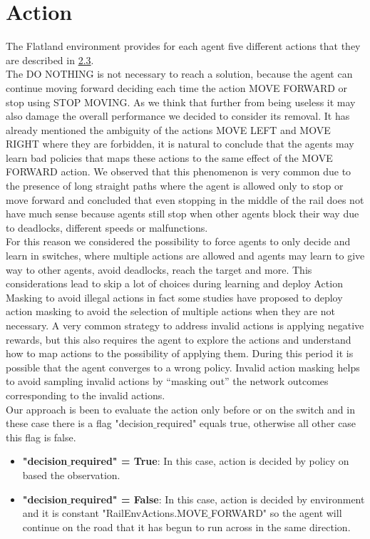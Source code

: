 \section{Action}
The Flatland environment provides for each agent five different actions that they are described in \hyperref[sec:envActions]{2.3}. \\ 
The DO NOTHING is not necessary to reach a solution, because the agent can continue moving forward deciding each time the action MOVE FORWARD or stop using STOP MOVING. As we think that further from being useless it may also damage the overall performance we decided to consider its removal. It has already mentioned the ambiguity of the actions MOVE LEFT and MOVE RIGHT where they are forbidden, it is natural to conclude that the agents may learn bad policies that maps these actions to the same effect of the MOVE FORWARD action. We observed that this phenomenon is very common due to the presence of long straight paths where the agent is allowed only to stop or move forward and concluded that even stopping in the middle of the rail does not have much sense because agents still stop when other agents block their way due to deadlocks, different speeds or malfunctions. \\
For this reason we considered the possibility to force agents to only decide and learn in switches, where multiple actions are allowed and agents may learn to give way to other agents, avoid deadlocks, reach the target and more. This considerations lead to skip a lot of choices during learning and deploy Action Masking to avoid illegal actions in fact some studies have proposed to deploy action masking to avoid the selection of multiple actions when they are not necessary. A very common strategy to address invalid actions is applying negative rewards, but this also requires the agent to explore the actions and understand how to map actions to the possibility of applying them. During this period it is possible that the agent converges to a wrong policy. Invalid action masking helps to avoid sampling invalid actions by “masking out” the network outcomes corresponding to the invalid actions. \\
Our approach is been to evaluate the action only before or on the switch and in these case there is a flag "decision$\_$required" equals true, otherwise all other case this flag is false. 
\begin{itemize}
\item \textbf{"decision$\_$required" = True}: In this case, action is decided by policy on based the observation.
\item \textbf{"decision$\_$required" = False}: In this case, action is decided by environment and it is constant "RailEnvActions.MOVE$\_$FORWARD" so the agent will continue on the road that it has begun to run across in the same direction.
\end{itemize}
